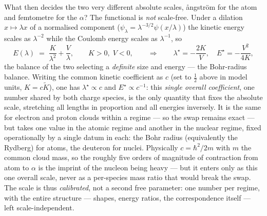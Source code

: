 \documentclass[11pt]{article}
\begin{document}
What then decides the two very different absolute scales, {\aa}ngstr\"om for the atom and femtometre
for the $\alpha$? The functional is \emph{not} scale-free. Under a dilation $x\mapsto\lambda x$ of a
normalised component ($\psi_\lambda=\lambda^{-3/2}\psi(x/\lambda)$) the kinetic energy scales as
$\lambda^{-2}$ while the Coulomb energy scales as $\lambda^{-1}$, so
\begin{equation}
E(\lambda) \;=\; \frac{K}{\lambda^{2}} + \frac{V}{\lambda}, \qquad K>0,\; V<0,
\qquad\Longrightarrow\qquad
\lambda^\star = -\frac{2K}{V}, \quad E^\star = -\frac{V^{2}}{4K},
\end{equation}
the balance of the two selecting a \emph{definite} size and energy --- the Bohr-radius balance. Writing
the common kinetic coefficient as $c$ (set to $\tfrac12$ above in model units, $K=c\tilde K$), one has
$\lambda^\star\propto c$ and $E^\star\propto c^{-1}$: this \emph{single overall coefficient}, one number
shared by both charge species, is the only quantity that fixes the absolute scale, stretching all
lengths in proportion and all energies inversely. It is the same for electron and proton clouds within
a regime --- so the swap remains exact --- but takes one value in the atomic regime and another in the
nuclear regime, fixed operationally by a single datum in each: the Bohr radius (equivalently the
Rydberg) for atoms, the deuteron for nuclei. Physically $c=\hbar^{2}/2m$ with $m$ the common cloud
mass, so the roughly five orders of magnitude of contraction from atom to $\alpha$ is the imprint of
the nucleon being heavy --- but it enters only as this one overall scale, never as a per-species mass
ratio that would break the swap. The scale is thus \emph{calibrated}, not a second free parameter: one
number per regime, with the entire structure --- shapes, energy ratios, the correspondence itself ---
left scale-independent.
\end{document}
